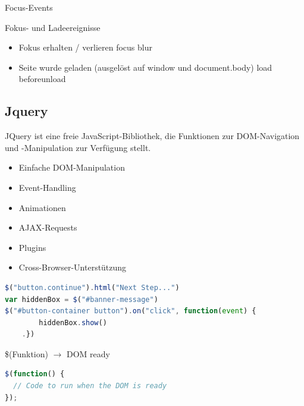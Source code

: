 \begin{definition}{Focus-Events}

Fokus- und Ladeereignisse
\begin{itemize}
  \item Fokus erhalten / verlieren
  \subitem focus
  \subitem blur
  \item Seite wurde geladen (ausgelöst auf window und document.body)
  \subitem load
  \subitem beforeunload
\end{itemize}
\end{definition}



\pagebreak

\subsection{Jquery}

\begin{concept}{JQuery}
    ist eine freie JavaScript-Bibliothek, die Funktionen zur DOM-Navigation und -Manipulation zur Verfügung stellt.
    \begin{itemize}
        \item Einfache DOM-Manipulation
        \item Event-Handling
        \item Animationen
        \item AJAX-Requests
        \item Plugins
        \item Cross-Browser-Unterstützung
    \end{itemize}

\begin{lstlisting}[language=JavaScript, style=basesmol]
$("button.continue").html("Next Step...")
var hiddenBox = $("#banner-message")
$("#button-container button").on("click", function(event) {
        hiddenBox.show()
    .})
\end{lstlisting}
\end{concept}

\begin{definition}{\$(Funktion)} $\rightarrow$ DOM ready\\
\begin{lstlisting}[language=JavaScript, style=basesmol]
$(function() { 
  // Code to run when the DOM is ready
});
\end{lstlisting}
\end{definition}

